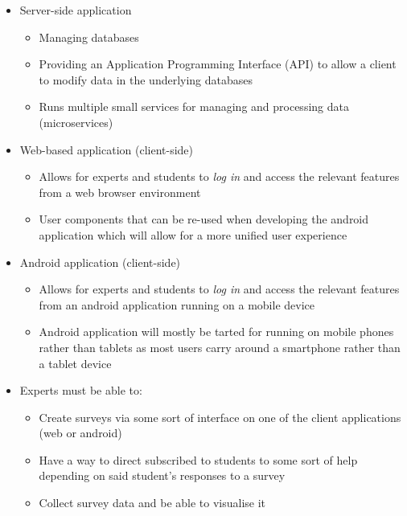 \begin{itemize}
    \tightlist
    \item Server-side application
    \begin{itemize}
        \item Managing databases
        \item Providing an Application Programming Interface (API) to allow a client to modify data in the underlying databases
        \item Runs multiple small services for managing and processing data (microservices)
    \end{itemize}

    \item Web-based application (client-side)
    \begin{itemize}
        \item Allows for experts and students to \emph{log in} and access the relevant features from a web browser environment
        \item User components that can be re-used when developing the android application which will allow for a more unified user experience
    \end{itemize}

    \item Android application (client-side)
    \begin{itemize}
        \item Allows for experts and students to \emph{log in} and access the relevant features from an android application running on a mobile device 
        \item Android application will mostly be tarted for running on mobile phones rather than tablets as most users carry around a smartphone rather than a tablet device
    \end{itemize}

    \item Experts must be able to:
    \begin{itemize}
        \item Create surveys via some sort of interface on one of the client applications (web or android)
        \item Have a way to direct subscribed to students to some sort of help depending on said student's responses to a survey 
        \item Collect survey data and be able to visualise it 
    \end{itemize}
\end{itemize}

